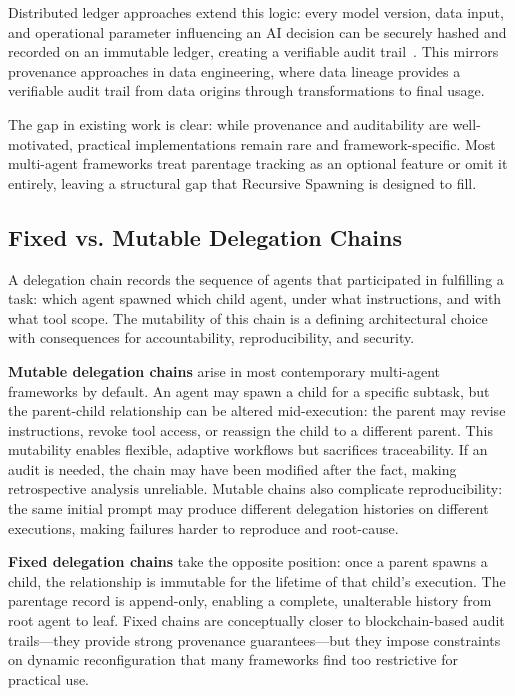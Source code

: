 Distributed ledger approaches extend this logic: every model version, data input, and operational parameter influencing an AI decision can be securely hashed and recorded on an immutable ledger, creating a verifiable audit trail~\cite{flexblok_blockchain}. This mirrors provenance approaches in data engineering, where data lineage provides a verifiable audit trail from data origins through transformations to final usage.

The gap in existing work is clear: while provenance and auditability are well-motivated, practical implementations remain rare and framework-specific. Most multi-agent frameworks treat parentage tracking as an optional feature or omit it entirely, leaving a structural gap that Recursive Spawning is designed to fill.

\subsection{Fixed vs. Mutable Delegation Chains}

A delegation chain records the sequence of agents that participated in fulfilling a task: which agent spawned which child agent, under what instructions, and with what tool scope. The mutability of this chain is a defining architectural choice with consequences for accountability, reproducibility, and security.

\textbf{Mutable delegation chains} arise in most contemporary multi-agent frameworks by default. An agent may spawn a child for a specific subtask, but the parent-child relationship can be altered mid-execution: the parent may revise instructions, revoke tool access, or reassign the child to a different parent. This mutability enables flexible, adaptive workflows but sacrifices traceability. If an audit is needed, the chain may have been modified after the fact, making retrospective analysis unreliable. Mutable chains also complicate reproducibility: the same initial prompt may produce different delegation histories on different executions, making failures harder to reproduce and root-cause.

\textbf{Fixed delegation chains} take the opposite position: once a parent spawns a child, the relationship is immutable for the lifetime of that child's execution. The parentage record is append-only, enabling a complete, unalterable history from root agent to leaf. Fixed chains are conceptually closer to blockchain-based audit trails—they provide strong provenance guarantees—but they impose constraints on dynamic reconfiguration that many frameworks find too restrictive for practical use.

